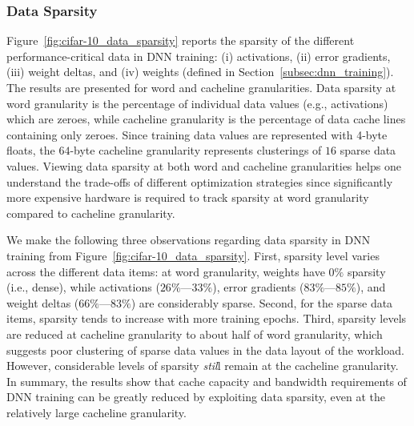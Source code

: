\subsubsection{Data Sparsity} 
Figure~\ref{fig:cifar-10_data_sparsity} reports the sparsity of the different performance-critical data in DNN training: (i) activations, (ii) error gradients, (iii) weight deltas, and (iv) weights (defined in Section~\ref{subsec:dnn_training}).  The results are presented for word and cacheline granularities.  Data sparsity at word granularity is the percentage of individual data values (e.g., activations) which are zeroes, while cacheline granularity is the percentage of data cache lines containing only zeroes.  Since training data values are represented with 4-byte floats, the $64$-byte cacheline granularity represents clusterings of $16$ sparse data values.  Viewing data sparsity at both word and cacheline granularities helps one understand the trade-offs of different optimization strategies since significantly more expensive hardware is required to track sparsity at word granularity compared to cacheline granularity.  

We make the following three observations regarding data sparsity in DNN training from Figure~\ref{fig:cifar-10_data_sparsity}.  First, sparsity level varies across the different data items: at word granularity, weights have $0\%$ sparsity (i.e., dense), while activations ($26\%$---$33\%$), error gradients ($83\%$---$85\%$), and weight deltas ($66\%$---$83\%$) are considerably sparse.   Second, for the sparse data items, sparsity tends to increase with more training epochs.  Third, sparsity levels are reduced at cacheline granularity to about half of word granularity, which suggests poor clustering of sparse data values in the data layout of the workload.  However, considerable levels of sparsity \emph{stil}l remain at the cacheline granularity.  In summary, the results show that cache capacity and bandwidth requirements of DNN training can be greatly reduced by exploiting data  sparsity, even at the relatively large cacheline granularity.

